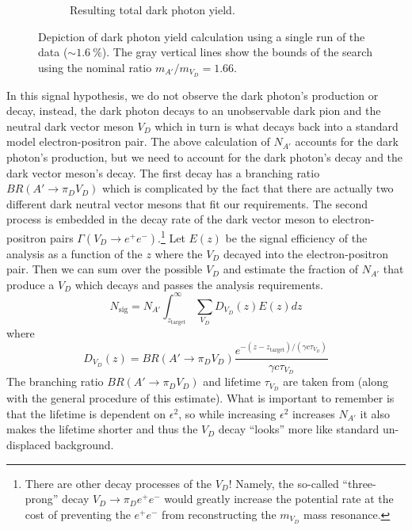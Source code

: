 \begin{figure}
\begin{subfigure}[T]{0.48\textwidth}
    \caption{Resulting total dark photon yield.}
    \label{fig:dark-photon-yield-calc:result}
  \end{subfigure}
  \caption{Depiction of dark photon yield calculation using a single run
  of the data ($\sim\qty{1.6}{\%}$).
  The gray vertical lines show the bounds of the search using the
  nominal ratio $m_{A'}/m_{V_D} = 1.66$.}
  \label{fig:dark-photon-yield-calc}
\end{figure}

In this signal hypothesis, we do not observe the dark photon's production or decay,
instead, the dark photon decays to an unobservable dark pion and the neutral dark
vector meson $V_D$ which in turn is what decays back into a standard model electron-positron pair.
The above calculation of $N_{A'}$ accounts for the dark photon's production, but
we need to account for the dark photon's decay and the dark vector meson's decay.
The first decay has a branching ratio $BR(A'\to\pi_D V_D)$ which is complicated
by the fact that there are actually two different dark neutral vector mesons that
fit our requirements.
The second process is embedded in the decay rate of the dark vector meson to
electron-positron pairs $\Gamma(V_D\to e^+e^-)$.\footnote{
  There are other decay processes of the $V_D$!
  Namely, the so-called ``three-prong'' decay $V_D\to\pi_De^+e^-$ would
  greatly increase the potential rate at the cost of preventing the $e^+e^-$
  from reconstructing the $m_{V_D}$ mass resonance.
}
Let $E(z)$ be the signal efficiency of the analysis as a function of the $z$ where the
$V_D$ decayed into the electron-positron pair.
Then we can sum over the possible $V_D$ and estimate the fraction of $N_{A'}$
that produce a $V_D$ which decays and passes the analysis requirements.
\begin{equation}
  N_\mathrm{sig} = N_{A'}\int_{z_\mathrm{target}}^\infty \sum_{V_D} D_{V_D}(z)E(z) dz
\end{equation}
where
\begin{equation}
  D_{V_D}(z) = BR(A'\to\pi_D V_D)
  \frac{e^{-(z-z_\mathrm{target})/(\gamma c \tau_{V_D})}}{\gamma c \tau_{V_D}}
\end{equation}
The branching ratio $BR(A'\to\pi_D V_D)$ and lifetime $\tau_{V_D}$ are taken
from \cite{simp-pheno-2018} (along with the general procedure of this estimate).
What is important to remember is that the lifetime is dependent on $\epsilon^2$,
so while increasing $\epsilon^2$ increases $N_{A'}$ it also makes the lifetime shorter
and thus the $V_D$ decay ``looks'' more like standard un-displaced background.

